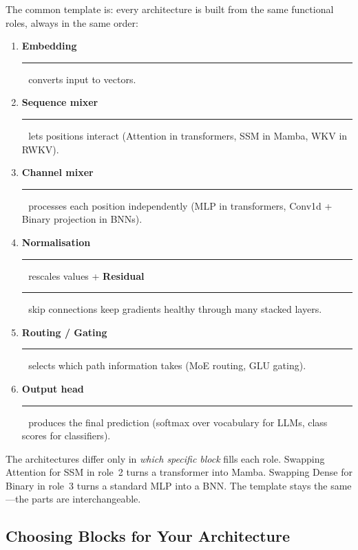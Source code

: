 \begin{engineernote}
{%
%
%
%
%
%
%
The common template is: every architecture is built from
the same functional roles, always in the same order:
\begin{enumerate}[leftmargin=2em, itemsep=2pt]
  \item \textbf{Embedding}
    \,{\color{roleEmbed}\rule{0.8em}{0.8em}}\,~converts input to
    vectors.
  \item \textbf{Sequence mixer}
    \,{\color{roleSeqMix}\rule{0.8em}{0.8em}}\,~lets positions
    interact (Attention in transformers, SSM in Mamba, WKV in RWKV).
  \item \textbf{Channel mixer}
    \,{\color{roleChanMix}\rule{0.8em}{0.8em}}\,~processes each
    position independently (MLP in transformers, Conv1d + Binary
    projection in BNNs).
  \item \textbf{Normalisation}
    \,{\color{roleNorm}\rule{0.8em}{0.8em}}\,~rescales values +
    \textbf{Residual}
    \,{\color{roleResid}\rule{0.8em}{0.8em}}\,~skip connections
    keep gradients healthy through many stacked layers.
  \item \textbf{Routing / Gating}
    \,{\color{roleRoute}\rule{0.8em}{0.8em}}\,~selects which path
    information takes (MoE routing, GLU gating).
  \item \textbf{Output head}
    \,{\color{roleOutput}\rule{0.8em}{0.8em}}\,~produces the final
    prediction (softmax over vocabulary for LLMs, class scores for
    classifiers).
\end{enumerate}
The architectures differ only in \emph{which specific block} fills
each role. Swapping Attention for SSM in role~2 turns a transformer
into Mamba. Swapping Dense for Binary in role~3 turns a standard MLP
into a BNN. The template stays the same---the parts are
interchangeable.}
\end{engineernote}



\subsection{Choosing Blocks for Your Architecture}
\label{sec:choosing-blocks}

